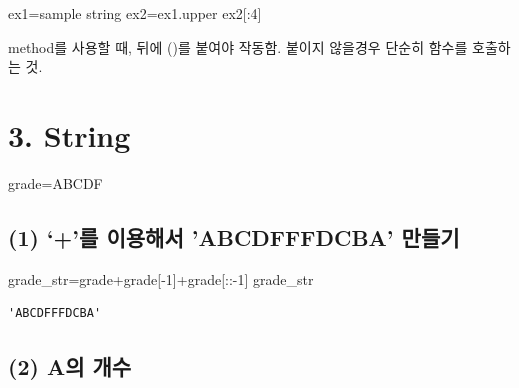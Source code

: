\documentclass[
  letterpaper,
  DIV=11,
  numbers=noendperiod]{scrreprt}
\newenvironment{Shaded}{\begin{snugshade}}{\end{snugshade}}
\newcommand{\DecValTok}[1]{\textcolor[rgb]{0.68,0.00,0.00}{#1}}
\newcommand{\NormalTok}[1]{\textcolor[rgb]{0.00,0.23,0.31}{#1}}
\newcommand{\OperatorTok}[1]{\textcolor[rgb]{0.37,0.37,0.37}{#1}}
\newcommand{\StringTok}[1]{\textcolor[rgb]{0.13,0.47,0.30}{#1}}
\begin{document}
\begin{Shaded}
\begin{Highlighting}[]
\NormalTok{ex1}\OperatorTok{=}\StringTok{\textquotesingle{}sample string\textquotesingle{}}
\NormalTok{ex2}\OperatorTok{=}\NormalTok{ex1.upper}
\NormalTok{ex2[:}\DecValTok{4}\NormalTok{]}
\end{Highlighting}
\end{Shaded}

method를 사용할 때, 뒤에 ()를 붙여야 작동함. 붙이지 않을경우 단순히
함수를 호출하는 것.

\section*{3. String}\label{string}


\begin{Shaded}
\begin{Highlighting}[]
\NormalTok{grade}\OperatorTok{=}\StringTok{\textquotesingle{}ABCDF\textquotesingle{}}
\end{Highlighting}
\end{Shaded}

\subsection*{(1) `+'를 이용해서 'ABCDFFFDCBA'
만들기}\label{uxb97c-uxc774uxc6a9uxd574uxc11c-abcdfffdcba-uxb9ccuxb4e4uxae30}

\begin{Shaded}
\begin{Highlighting}[]
\NormalTok{grade\_str}\OperatorTok{=}\NormalTok{grade}\OperatorTok{+}\NormalTok{grade[}\OperatorTok{{-}}\DecValTok{1}\NormalTok{]}\OperatorTok{+}\NormalTok{grade[::}\OperatorTok{{-}}\DecValTok{1}\NormalTok{]}
\NormalTok{grade\_str}
\end{Highlighting}
\end{Shaded}

\begin{verbatim}
'ABCDFFFDCBA'
\end{verbatim}

\subsection*{(2) A의 개수}\label{auxc758-uxac1cuxc218}
\end{document}

